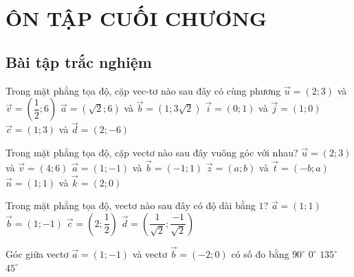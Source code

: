 \newpage\setcounter{dang}{0}
\section*{ÔN TẬP CUỐI CHƯƠNG}
\subsection{Bài tập trắc nghiệm}
\begin{ex}%
Trong mặt phẳng tọa độ, cặp vec-tơ nào sau đây có cùng phương
\choice
{$\overrightarrow{u}=(2;3)$ và $\overrightarrow{v}=\left(\dfrac{1}{2};6\right)$}
{\True $\overrightarrow{a}=(\sqrt{2};6)$ và $\overrightarrow{b}=(1;3\sqrt{2})$}
{$\overrightarrow{i}=(0;1)$ và $\overrightarrow{j}=(1;0)$}
{$\overrightarrow{c}=(1;3)$ và $\overrightarrow{d}=(2;-6)$}
\end{ex}
\begin{ex}%
Trong mặt phẳng tọa độ, cặp vectơ nào sau đây vuông góc với nhau?
\choice
{$\overrightarrow{u}=(2;3)$ và $\overrightarrow{v}=(4;6)$}
{$\overrightarrow{a}=(1;-1)$ và $\overrightarrow{b}=(-1;1)$}
{\True $\overrightarrow{z}=(a;b)$ và $\overrightarrow{t}=(-b;a)$}
{$\overrightarrow{n}=(1;1)$ và $\overrightarrow{k}=(2;0)$}
\end{ex}
\begin{ex}%
Trong mặt phẳng tọa độ, vectơ nào sau đây có độ dài bằng $1$?
\choice
{$\overrightarrow{a}=(1;1)$}
{$\overrightarrow{b}=(1;-1)$}
{$\overrightarrow{c}=\left(2;\dfrac{1}{2}\right)$}
{\True $\overrightarrow{d}=\left(\dfrac{1}{\sqrt{2}};\dfrac{-1}{\sqrt{2}}\right)$}
\end{ex}
\begin{ex}%
Góc giữa vectơ $\overrightarrow{a}=(1;-1)$ và vectơ $\overrightarrow{b}=(-2;0)$ có số đo bằng
\choice
{$90^\circ$}
{$0^\circ$}
{\True $135^\circ$}
{$45^\circ$}
\end{ex}
